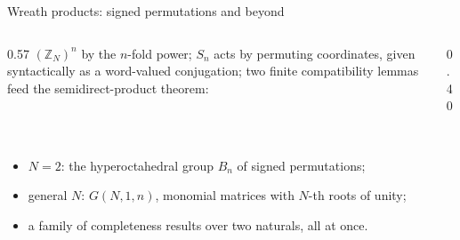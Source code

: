 \begin{frame}{Wreath products: signed permutations and beyond \InPaper}
\begin{columns}[c]
\begin{column}{0.57\textwidth}
$(\mathbb{Z}_N)^n$ by the $n$-fold power; $S_n$ acts by permuting coordinates,
given \alert{syntactically} as a word-valued conjugation; two finite
compatibility lemmas feed the semidirect-product theorem:
\begin{code}%
\>[0]\AgdaSpace{}%
\AgdaSymbol{:}\AgdaSpace{}%
\AgdaSpace{}%
\AgdaSpace{}%
\AgdaSpace{}%
\<%
\\
\>[0][@{}l@{\AgdaIndent{0}}]%
\>[2]\AgdaSymbol{(((}\AgdaSpace{}%
\AgdaSpace{}%
\AgdaSymbol{)}\AgdaSpace{}%
\AgdaSpace{}%
\AgdaSymbol{)}\AgdaSpace{}%
\AgdaSpace{}%
\AgdaSymbol{(}\AgdaSpace{}%
\AgdaSymbol{)}\AgdaSpace{}%
\AgdaSpace{}%
\AgdaSpace{}%
\AgdaSymbol{)}\<%
\\
\>[2][@{}l@{\AgdaIndent{0}}]%
\>[4]\AgdaSpace{}%
\AgdaSymbol{(}\AgdaSpace{}%
\AgdaSpace{}%
\AgdaSymbol{)}\<%
\end{code}
\begin{code}[hide]%
\>[0]\AgdaSpace{}%
\AgdaSpace{}%
\AgdaSpace{}%
\AgdaSymbol{=}\AgdaSpace{}%
\AgdaSpace{}%
\AgdaSpace{}%
\<%
\end{code}
\begin{itemize}
  \small
  \item $N=2$: the hyperoctahedral group $B_n$ of \alert{signed permutations};
  \item general $N$: $G(N,1,n)$, monomial matrices with $N$-th roots of unity;
  \item a family of completeness results over \alert{two naturals}, all at once.
\end{itemize}
\end{column}
\begin{column}{0.40\textwidth}

\end{column}
\end{columns}
\end{frame}
